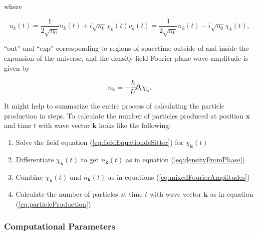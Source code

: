 \documentclass{article}
\begin{document}
                where

                \begin{subequations} \label{eq:mixedFourierAmplitudes}
                \begin{equation}
                    u_k(t) = \frac{1}{2 \sqrt{n_0}} n_k(t) + i \sqrt{n_0} \chi_k(t)
                \end{equation}
                \begin{equation}
                    v_k(t) = \frac{1}{2 \sqrt{n_0}} n_k(t) - i \sqrt{n_0} \chi_k(t),
                \end{equation}
                \end{subequations}

                ``out'' and ``exp'' corresponding to regions of spacetime outside of and inside the expansion of the universe, and the density field Fourier plane wave amplitude is given by 

                \begin{equation} \label{eq:densityFromPhase}
                    n_\mathbf{k} = - \frac{\hbar}{U} \partial_t \chi_\mathbf{k}.
                \end{equation}

                It might help to summarize the entire process of calculating the particle production in steps. To calculate the number of particles produced at position $\mathbf{x}$ and time $t$ with wave vector $\mathbf{k}$ looks like the following:

                \begin{enumerate}
                    \item Solve the field equation (\ref{eq:fieldEquationdeSitter}) for $\chi_\mathbf{k}(t)$
                    \item Differentiate $\chi_\mathbf{k}(t)$ to get $n_\mathbf{k}(t)$ as in equation (\ref{eq:densityFromPhase})
                    \item Combine $\chi_\mathbf{k}(t)$ and $n_\mathbf{k}(t)$ as in equations (\ref{eq:mixedFourierAmplitudes})
                    \item Calculate the number of particles at time $t$ with wave vector $\mathbf{k}$ as in equation (\ref{eq:particleProduction})
                \end{enumerate}

            \subsubsection{Computational Parameters} \label{sec:parameters}
\end{document}
